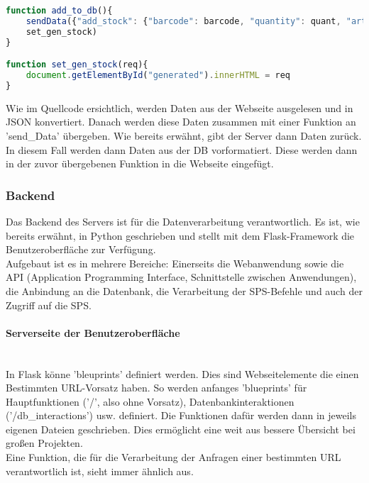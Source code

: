 \begin{lstlisting}[language=JavaScript]
function add_to_db(){
    sendData({"add_stock": {"barcode": barcode, "quantity": quant, "article": article}}, 
    set_gen_stock)
}

function set_gen_stock(req){
    document.getElementById("generated").innerHTML = req
}\end{lstlisting}

Wie im Quellcode ersichtlich, werden Daten aus der Webseite ausgelesen und in JSON konvertiert. Danach werden diese Daten zusammen mit einer Funktion an 'send\_Data' übergeben. Wie bereits erwähnt, gibt der Server dann Daten zurück. In diesem Fall werden dann Daten aus der DB vorformatiert. Diese werden dann in der zuvor übergebenen Funktion in die Webseite eingefügt.

\subsubsection{Backend}
Das Backend des Servers ist für die Datenverarbeitung verantwortlich. Es ist, wie bereits erwähnt, in Python geschrieben und stellt mit dem Flask-Framework die Benutzeroberfläche zur Verfügung. \\
Aufgebaut ist es in mehrere Bereiche: Einerseits die Webanwendung sowie die API (Application Programming Interface, Schnittstelle zwischen Anwendungen), die Anbindung an die Datenbank, die Verarbeitung der SPS-Befehle und auch der Zugriff auf die SPS.
 


\paragraph{Serverseite der Benutzeroberfläche}\mbox{}\\
In Flask könne 'bleuprints' definiert werden. Dies sind Webseitelemente die einen Bestimmten URL-Vorsatz haben. So werden anfanges 'blueprints' für Hauptfunktionen ('/', also ohne Vorsatz), Datenbankinteraktionen ('/db\_interactions') usw. definiert. Die Funktionen dafür werden dann in jeweils eigenen Dateien geschrieben. Dies ermöglicht eine weit aus bessere Übersicht bei großen Projekten. \\
Eine Funktion, die für die Verarbeitung der Anfragen einer bestimmten URL verantwortlich ist, sieht immer ähnlich aus.

